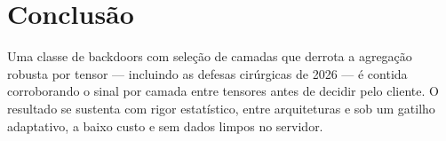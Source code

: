 \section{Conclusão}
Uma classe de backdoors com seleção de camadas que derrota a agregação robusta por tensor ---
incluindo as defesas cirúrgicas de 2026 --- é contida corroborando o sinal por camada entre tensores
antes de decidir pelo cliente. O resultado se sustenta com rigor estatístico, entre arquiteturas e sob
um gatilho adaptativo, a baixo custo e sem dados limpos no servidor.
